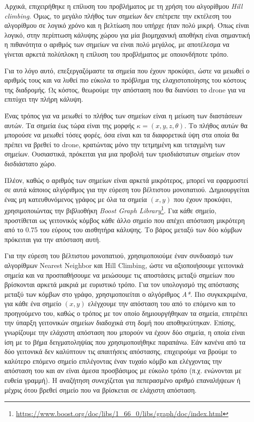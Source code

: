 Αρχικά, επιχειρήθηκε η επίλυση του προβλήματος με τη χρήση του αλγορίθμου \emph{Hill climbing}. Όμως, το μεγάλο πλήθος των σημείων δεν επέτρεπε την εκτέλεση του αλγορίθμου σε λογικό χρόνο και η βελτίωση που υπήρχε ήταν πολύ μικρή. Όπως είναι λογικό, στην περίπτωση κάλυψης χώρου για μία βιομηχανική αποθήκη είναι σημαντική η πιθανότητα ο αριθμός των σημείων να είναι πολύ μεγάλος, με αποτέλεσμα να γίνεται αρκετά πολύπλοκη η επίλυση του προβλήματος με οποιονδήποτε τρόπο.

Για το λόγο αυτό, επεξεργαζόμαστε τα σημεία που έχουν προκύψει, ώστε να μειωθεί ο αριθμός τους και να λυθεί πιο εύκολα το πρόβλημα της ελαχιστοποίησης του κόστους της διαδρομής. Ως κόστος, θεωρούμε την απόσταση που θα διανύσει το drone για να επιτύχει την πλήρη κάλυψη.

Ένας τρόπος για να μειωθεί το πλήθος των σημείων είναι η μείωση των διαστάσεων αυτών. Τα σημεία έως τώρα είναι της μορφής $\kappa = (x, y, z, \theta)$. Το πλήθος αυτών θα μπορούσε να μειωθεί τόσες φορές, όσα είναι και τα διαφορετικά ύψη στα οποία θα πρέπει να βρεθεί το drone, κρατώντας μόνο την τετμημένη και τεταγμένη των σημείων. Ουσιαστικά, πρόκειται για μια προβολή των τρισδιάστατων σημείων στον δισδιάστατο χώρο. 

Πλέον, καθώς ο αριθμός των σημείων είναι αρκετά μικρότερος, μπορεί να εφαρμοστεί σε αυτά κάποιος αλγόριθμος για την εύρεση του βέλτιστου μονοπατιού. Δημιουργείται ένας μη κατευθυνόμενος γράφος με όλα τα σημεία $(x, y)$ που έχουν προκύψει, χρησιμοποιώντας την βιβλιοθήκη \emph{Boost Graph Library}\footnote{\href{https://www.boost.org/doc/libs/1\_66\_0/libs/graph/doc/index.html}{https://www.boost.org/doc/libs/1\_66\_0/libs/graph/doc/index.html}}. Για κάθε σημείο, προστίθεται ως γειτονικός κόμβος κάθε άλλο σημείο που απέχει απόσταση μικρότερη από το 0.75 του εύρους του αισθητήρα κάλυψης. Το βάρος μεταξύ των δύο κόμβων πρόκειται για την απόσταση αυτή.

Για την εύρεση του βέλτιστου μονοπατιού, χρησιμοποιούμε έναν συνδυασμό των αλγορίθμων Nearest Neighbor και Hill Climbing, ώστε να αξιοποιήσουμε γειτονικά σημεία και να προσπαθήσουμε να μειώσουμε τις αποστάσεις μεταξύ σημείων που βρίσκονται αρκετά μακριά με ευριστικό τρόπο. Για τον υπολογισμό της απόστασης μεταξύ των κόμβων στο γράφο, χρησιμοποιείται ο αλγόριθμος \emph{A*}. Πιο συγκεκριμένα, για κάθε ένα σημείο $(x, y)$ ελέγχουμε την απόσταση του από το επόμενο και το προηγούμενο του, καθώς ο τρόπος με τον οποίο δημιουργήθηκαν τα σημεία, επιτρέπει την ύπαρξη γειτονικών σημείων διαδοχικά στη δομή που αποθηκεύτηκαν. Επίσης, γνωρίζουμε την ελάχιστη απόσταση που μπορούν να έχουν δύο σημεία, η οποία είναι ίση με το βήμα δειγματοληψίας που χρησιμοποιήθηκε παραπάνω. Εάν κανένα από τα δύο γειτονικά δεν καλύπτουν τις απαιτήσεις απόστασης, επιχειρούμε να βρούμε το καλύτερο επόμενο σημείο επιλέγοντας έναν τυχαίο κόμβο και ελέγχοντας την απόσταση του και αν είναι άμεσα προσβάσιμος με εύκολο τρόπο (π.χ. ενώνονται με ευθεία γραμμή). Η αναζήτηση συνεχίζεται για πεπερασμένο αριθμό επαναλήψεων ή μέχρις ότου βρεθεί σημείο που να βρίσκεται σε ελάχιστη απόσταση. 

